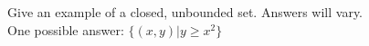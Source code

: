 {Give an example of a closed, unbounded set.}
{Answers will vary.\\
One possible answer: $\{(x,y) | y\geq x^2 \}$}
